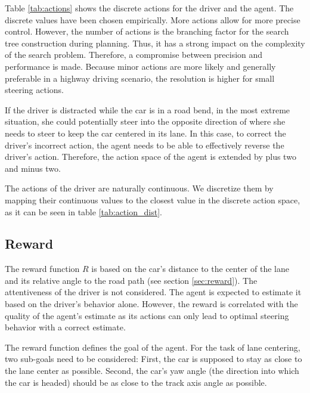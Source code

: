 \vspace{1em}
\noindent
Table \ref{tab:actions} shows the discrete actions for the driver and the agent. The discrete values have been chosen empirically. More actions allow for more precise control. However, the number of actions is the branching factor for the search tree construction during planning. Thus, it has a strong impact on the complexity of the search problem. Therefore, a compromise between precision and performance is made. Because minor actions are more likely and generally preferable in a highway driving scenario, the resolution is higher for small steering actions.

If the driver is distracted while the car is in a road bend, in the most extreme situation, she could potentially steer into the opposite direction of where she needs to steer to keep the car centered in its lane. In this case, to correct the driver's incorrect action, the agent needs to be able to effectively reverse the driver's action. Therefore, the action space of the agent is extended by plus two and minus two.



\label{sec:driver_act_discr}
\noindent
The actions of the driver are naturally continuous. We discretize them by mapping their continuous values to the closest value in the discrete action space, as it can be seen in table \ref{tab:action_dist}.



\subsection{Reward}

The reward function $R$ is based on the car's distance to the center of the lane and its relative angle to the road path (see section \ref{sec:reward}). The attentiveness of the driver is not considered. The agent is expected to estimate it based on the driver's behavior alone. However, the reward is correlated with the quality of the agent's estimate as its actions can only lead to optimal steering behavior with a correct estimate.

\label{sec:reward}

The reward function defines the goal of the agent. For the task of lane centering, two sub-goals need to be considered: First, the car is supposed to stay as close to the lane center as possible. Second, the car's yaw angle (the direction into which the car is headed) should be as close to the track axis angle as possible. 

